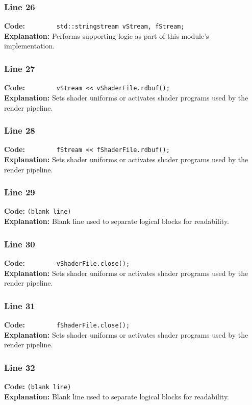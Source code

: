 \documentclass[11pt,a4paper]{article}
\begin{document}
\subsubsection*{Line 26}
\textbf{Code:} \verb|        std::stringstream vStream, fStream;|\\
\textbf{Explanation:} Performs supporting logic as part of this module's implementation.

\subsubsection*{Line 27}
\textbf{Code:} \verb|        vStream << vShaderFile.rdbuf();|\\
\textbf{Explanation:} Sets shader uniforms or activates shader programs used by the render pipeline.

\subsubsection*{Line 28}
\textbf{Code:} \verb|        fStream << fShaderFile.rdbuf();|\\
\textbf{Explanation:} Sets shader uniforms or activates shader programs used by the render pipeline.

\subsubsection*{Line 29}
\textbf{Code:} \texttt{(blank line)}\\
\textbf{Explanation:} Blank line used to separate logical blocks for readability.

\subsubsection*{Line 30}
\textbf{Code:} \verb|        vShaderFile.close();|\\
\textbf{Explanation:} Sets shader uniforms or activates shader programs used by the render pipeline.

\subsubsection*{Line 31}
\textbf{Code:} \verb|        fShaderFile.close();|\\
\textbf{Explanation:} Sets shader uniforms or activates shader programs used by the render pipeline.

\subsubsection*{Line 32}
\textbf{Code:} \texttt{(blank line)}\\
\textbf{Explanation:} Blank line used to separate logical blocks for readability.
\end{document}
